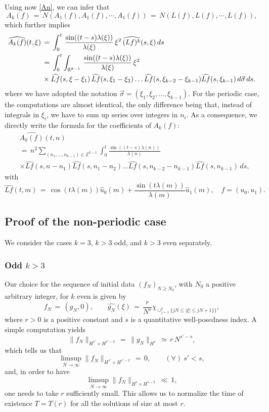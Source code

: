 \documentclass{amsart}
\newcommand{\wh}{\widehat}
\begin{document}
Using now \eqref{An}, we can infer that
\[
A_k(f)\,=\,N(A_1(f),A_1(f), \cdots, A_{1}(f))\,=\,N(L(f),L(f), \cdots, L(f)),\]
which further implies
\begin{equation}
\aligned
\widehat{A_{k}(f)}(t,\xi)\,&=\,\int_0^t\,\frac{\sin((t-s) \lambda(\xi))}{\lambda(\xi)}\, \xi^2\, \widehat{(Lf)^k}(s,\xi)\,ds\\
&=\,\int_0^t \int_{\mathbb{R}^{k-1}}\,\frac{\sin((t-s) \lambda(\xi))}{\lambda(\xi)}\, \xi^2\, 
\\
& \times \widehat{Lf}(s,\xi-\xi_{1})\,\widehat{Lf}(s,\xi_{1} - \xi_{2})\dots \wh{Lf}(s, \xi_{k-2}-\xi_{k-1})\wh{Lf}(s, \xi_{k-1}) \,d \vec{\sigma} \,ds.\endaligned
\label{A2f}
\end{equation}
where we have adopted the notation
$\vec{\sigma} = (\xi_{1}, \xi_{2}, \dots, \xi_{k-1})$.
For the periodic case, the computations are almost identical, the only difference being that, instead of integrals in $\xi_{i}$, we have to sum up series over integers in $n_{i}$. As a consequence, we directly write the formula for the coefficients of $A_{k}(f)$:
\begin{equation}
  \begin{split}
&  \widehat{A_{k}(f)}(t,n)\, 
\\
& = \, n^2 \sum_{(n_{1}, \ldots, n_{k-1})\in\mathbb{Z}^{k-1}} \int_0^t \frac{\sin((t-s) \lambda(n))}{\lambda(n)} 
\\
& \times \widehat{Lf}(s,n - n_{1}) \wh{Lf}(s, n_{1} - n_{2}) \dots \wh{Lf}(s, n_{k-2} - n_{k-1})
\wh{Lf}(s, n_{k-1})
\,ds,
\label{A2p}
\end{split}
\end{equation}
with
\[
\widehat{Lf}(t,m)\,=\,\cos(t \lambda(m)) \hat{u}_0(m)+\frac{\sin(t \lambda(m))}{\lambda(m)} \hat{u}_1(m),\quad f=(u_0,u_1).\]


\subsection{Proof of the non-periodic case} We consider the cases $k =3$, $k > 3$ odd,  and $k > 3$ even separately. 
\subsubsection{Odd $k >3$}
Our choice for the sequence of initial data $(f_N)_{N\geq N_0}$, with $N_0$ a positive arbitrary integer, for $k$ even is given by
\begin{equation}
f_N\,=\,(g_N, 0), \qquad \widehat{g_N}(\xi)\,=\,\frac{r}{N^s} \chi_{\cup_{j=1}^{2}\{jN \leq |\xi| \leq jN + 1\}\}},
\label{fn}
\end{equation}
where $r>0$ is a positive constant and $s$ is a quantitative well-posedness index. A simple computation yields
\begin{equation}
\|f_N\|_{H^{s'}\times H^{s'-2}}\,=\,\|g_N\|_{H^s}\,\simeq\,r\,N^{s'-s},
\label{hsfn}
\end{equation}
which tells us that
\[
\limsup_{N\to \infty} \|f_N\|_{H^{s'} \times H^{s' -2}}\,=\,0, \qquad (\forall)\ s'<s, 
\]
and, in order to have 
\[
\limsup_{N\to \infty} \|f_N\|_{H^s \times H^{s -2}}\,\ll\,1,
\]
one needs to take $r$ sufficiently small. This allows us to normalize the time of existence $T=T(r)$ for all the solutions of size at most $r$.
\end{document}
